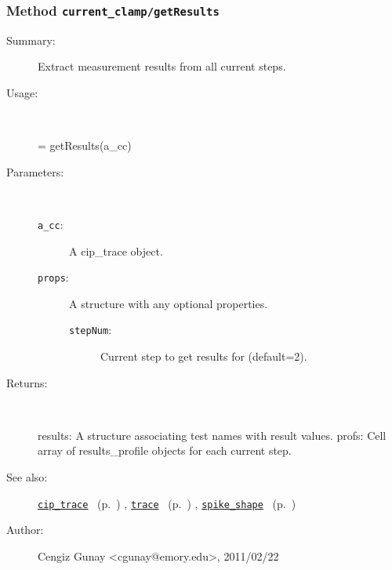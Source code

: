 \subsubsection[Method \texttt{getResults}]{Method \texttt{current\_clamp/getResults}}%
%
\label{ref_current_clamp__getResults}%
\hypertarget{ref_current_clamp__getResults}{}%
\begin{description}
\item[Summary:]Extract measurement results from all current steps.
%
\item[Usage:]~%
\begin{lyxcode}%
[results profs] = getResults(a\_cc)
%
\end{lyxcode}%
%
%
\item[Parameters:]~
\begin{description}%
\item[\texttt{a\_cc}:]
 A cip\_trace object.
\item[\texttt{props}:]
 A structure with any optional properties.
\begin{description}%
\item[\texttt{stepNum}:]
 Current step to get results for (default=2).
\end{description}%
\end{description}%
%
\item[Returns:
]~

   results: A structure associating test names with result values.
   profs: Cell array of results\_profile objects for each current step.
%
%
\item[See also:]%
\hyperlink{ref_cip_trace}{\texttt{cip\_trace}}%
\ (p.~\pageref{ref_cip_trace})%
%
, \hyperlink{ref_trace}{\texttt{trace}}%
\ (p.~\pageref{ref_trace})%
%
, \hyperlink{ref_spike_shape}{\texttt{spike\_shape}}%
\ (p.~\pageref{ref_spike_shape})%
%
%
\item[Author:]%
Cengiz Gunay <cgunay@emory.edu>, 2011/02/22
%
\end{description}
\methodline%
